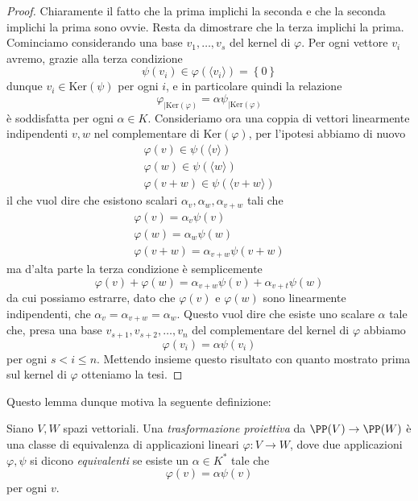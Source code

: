 \documentclass[11pt]{scrartcl}
\renewcommand{\ker}[1]{\text{Ker}\left(#1\right)}
\begin{document}
   	 \begin{proof}
   	 	Chiaramente il fatto che la prima implichi la seconda e che la seconda implichi la prima sono ovvie. Resta da dimostrare che la terza implichi la prima. \\
   	 	Cominciamo considerando una base $v_1,\dots,v_s$ del kernel di $\varphi$. Per ogni vettore $v_i$ avremo, grazie alla terza condizione
   	 	$$\psi(v_i)\in \varphi(\langle v_i\rangle)=\left\{0\right\}$$
   	 	dunque $v_i\in \ker{\psi}$ per ogni $i$, e in particolare quindi la relazione 
   	 	$$\varphi_{\mid \ker{\varphi}}=\alpha\psi_{\mid \ker{\varphi}}$$
   	 	è soddisfatta per ogni $\alpha\in K$. Consideriamo ora una coppia di vettori linearmente indipendenti $v,w$ nel complementare di $\ker{\varphi}$, per l'ipotesi abbiamo di nuovo
   	 	\begin{gather*}
   	 		\varphi(v)\in \psi (\langle v \rangle) \\
   	 		\varphi(w)\in \psi (\langle w \rangle) \\
   	 		\varphi(v+w)\in \psi (\langle v+w \rangle)
   	 	\end{gather*}
   	 	il che vuol dire che esistono scalari $\alpha_v,\alpha_w,\alpha_{v+w}$ tali che
   	 	\begin{gather*}
   	 		\varphi(v)=\alpha_{v} \psi (v) \\
   	 		\varphi(w)=\alpha_{w} \psi (w) \\ 
   	 		\varphi(v+w)=\alpha_{v+w} \psi (v+w)
   	 	\end{gather*}
   	 	ma d'alta parte la terza condizione è semplicemente
   	 	\begin{equation*}
   	 		\varphi(v)+\varphi(w)=\alpha_{v+w}\psi(v)+\alpha_{v+t}\psi(w)
   	 	\end{equation*}
   	 	da cui possiamo estrarre, dato che $\varphi(v)$ e $\varphi(w)$ sono linearmente indipendenti, che $\alpha_v=\alpha_{v+w}=\alpha_w$. Questo vuol dire che esiste uno scalare $\alpha$ tale che, presa una base $v_{s+1},v_{s+2},\dots,v_n$ del complementare del kernel di $\varphi$ abbiamo 
   	 	$$\varphi(v_i)=\alpha \psi(v_i)$$
   	 	per ogni $s< i\le n$. Mettendo insieme questo risultato con quanto mostrato prima sul kernel di $\varphi$ otteniamo la tesi.
   	 \end{proof}
   	 Questo lemma dunque motiva la seguente definizione:
   	 \begin{definition}
   	 	Siano $V,W$ spazi vettoriali. Una \textit{trasformazione proiettiva} da $\PP(V)\to   \PP(W)$ è una classe di equivalenza di applicazioni lineari $\varphi:V\to W$, dove due applicazioni $\varphi,\psi$ si dicono \textit{equivalenti} se esiste un $\alpha\in K^*$ tale che 
   	 	$$\varphi(v)=\alpha \psi(v)$$
   	 	per ogni $v$.
   	 \end{definition}
\end{document}
